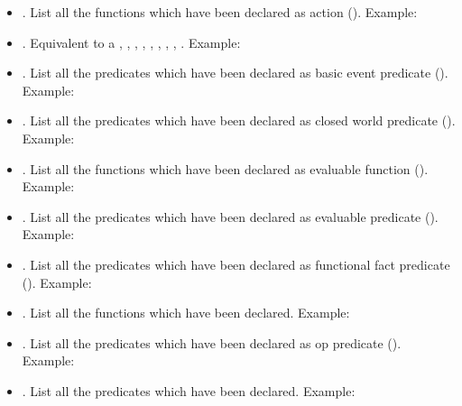 \begin{itemize}

\item {}. List all the functions which have been declared as
action ().\* 
Example: 

\item {}. Equivalent to a , ,
, , ,
, , , .\*  
Example: 

\item {}. List all the predicates which have been declared as basic
event predicate ().\*
Example: 

\item {}. List all the predicates which have been declared as
closed world predicate ().\* 
Example: 

\item {}. List all the functions which have been declared as
evaluable function ().\* 
Example: 

\item {}. List all the predicates which have been declared as
evaluable predicate ().\* 
Example: 

\item {}. List all the predicates which have been declared as
functional fact predicate ().\* 
Example: 

\item {}. List all the functions which have been declared.\* 
Example: 

\item {}. List all the predicates which have been declared as
op predicate ().\* 
Example: 

\item {}. List all the predicates which have been declared.\* 
Example: 

\end{itemize}

